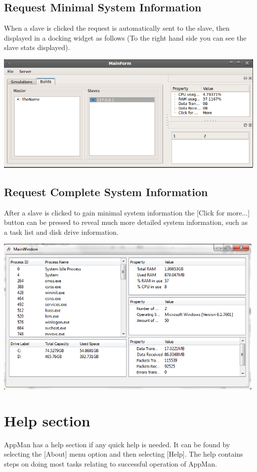 \documentclass[a4paper,12pt,final]{article}
\begin{document}
\subsection{Request Minimal System Information}
When a slave is clicked the request is automatically sent to the slave, then displayed in a docking widget as follows (To the right hand side you can see the slave stats displayed).

\begin{center}
  	\includegraphics[scale=0.4]{SlaveStats.png}
 \end{center}
 
\subsection{Request Complete System Information}
After a slave is clicked to gain minimal system information the [Click for more...] button can be pressed to reveal much more detailed system information, such as a task list and disk drive information.

\begin{center}
  	\includegraphics[scale=0.5]{DetSlaveStats.png}
 \end{center}
 
\section{Help section}
AppMan has a help section if any quick help is needed. It can be found by selecting the [About] menu option and then selecting [Help].  The help contains steps on doing most tasks relating to successful operation of AppMan.
\end{document}
